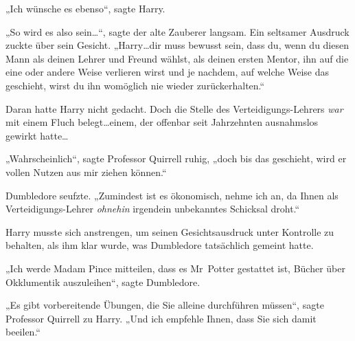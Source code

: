 „Ich wünsche es ebenso“, sagte Harry.

„So wird es also sein…“, sagte der alte Zauberer langsam. Ein seltsamer Ausdruck zuckte über sein Gesicht. „Harry…dir muss bewusst sein, dass du, wenn du diesen Mann als deinen Lehrer und Freund wählst, als deinen ersten Mentor, ihn auf die eine oder andere Weise verlieren wirst und je nachdem, auf welche Weise das geschieht, wirst du ihn womöglich nie wieder zurückerhalten.“

Daran hatte Harry nicht gedacht. Doch die Stelle des Verteidigungs-Lehrers \emph{war} mit einem Fluch belegt…einem, der offenbar seit Jahrzehnten ausnahmslos gewirkt hatte…

„Wahrscheinlich“, sagte Professor Quirrell ruhig, „doch bis das geschieht, wird er vollen Nutzen aus mir ziehen können.“

Dumbledore seufzte. „Zumindest ist es ökonomisch, nehme ich an, da Ihnen als Verteidigungs-Lehrer \emph{ohnehin} irgendein unbekanntes Schicksal droht.“

Harry musste sich anstrengen, um seinen Gesichtsausdruck unter Kontrolle zu behalten, als ihm klar wurde, was Dumbledore tatsächlich gemeint hatte.

„Ich werde Madam Pince mitteilen, dass es Mr~Potter gestattet ist, Bücher über Okklumentik auszuleihen“, sagte Dumbledore.

„Es gibt vorbereitende Übungen, die Sie alleine durchführen müssen“, sagte Professor Quirrell zu Harry. „Und ich empfehle Ihnen, dass Sie sich damit beeilen.“

